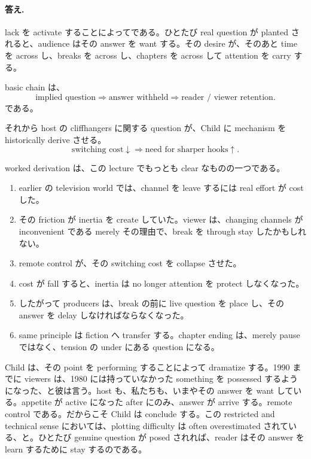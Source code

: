 \paragraph{答え.} lack を activate することによってである。ひとたび real question が planted されると、audience はその answer を want する。その desire が、そのあと time を across し、breaks を across し、chapters を across して attention を carry する。

basic chain は、
\begin{equation}
\text{implied question} \Longrightarrow \text{answer withheld} \Longrightarrow \text{reader / viewer retention}.
\end{equation}
である。

それから host の cliffhangers に関する question が、Child に mechanism を historically derive させる。
\begin{equation}
\text{switching cost} \downarrow \Longrightarrow \text{need for sharper hooks} \uparrow.
\end{equation}

worked derivation は、この lecture でもっとも clear なものの一つである。
\begin{enumerate}
\item earlier の television world では、channel を leave するには real effort が cost した。
\item その friction が inertia を create していた。viewer は、changing channels が inconvenient である merely その理由で、break を through stay したかもしれない。
\item remote control が、その switching cost を collapse させた。
\item cost が fall すると、inertia は no longer attention を protect しなくなった。
\item したがって producers は、break の前に live question を place し、その answer を delay しなければならなくなった。
\item same principle は fiction へ transfer する。chapter ending は、merely pause ではなく、tension の under にある question になる。
\end{enumerate}

Child は、その point を performing することによって dramatize する。1990 までに viewers は、1980 には持っていなかった something を possessed するようになった、と彼は言う。host も、私たちも、いまやその answer を want している。appetite が active になった after にのみ、answer が arrive する。remote control である。だからこそ Child は conclude する。この restricted and technical sense においては、plotting difficulty は often overestimated されている、と。ひとたび genuine question が posed されれば、reader はその answer を learn するために stay するのである。


